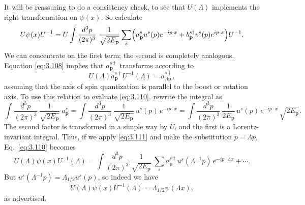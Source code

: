 It will be reassuring to do a consistency check, to see that $U(\Lambda)$
implements the right transformation on $\psi(x)$.  So calculate
\begin{equation}
  U\psi(x)U^{-1} = U \int \frac{d^3p}{(2\pi)^3}\ \frac{1}{\sqrt{2E_{\mathbf{p}}}}
    \sum_s \Bigl( a_{\mathbf{p}}^s u^s(p)e^{-ip\cdot x}
      + b_{\mathbf{p}}^{s\dagger} v^s(p)e^{ip\cdot x} \Bigr) U^{-1}.
  \label{eq:3.110}
\end{equation}
We can concentrate on the first term; the second is completely analogous.
Equation \eqref{eq:3.108} implies that $a_{\mathbf{p}}^{s\dagger}$ transforms
according to
\begin{equation}
  U(\Lambda)a_{\mathbf{p}}^{s\dagger}U^{-1}(\Lambda)
    = a_{\Lambda\mathbf{p}}^{s\dagger},
  \label{eq:3.111}
\end{equation}
assuming that the axis of spin quantization is parallel to the boost or
rotation axis.  To use this relation to evaluate \eqref{eq:3.110}, rewrite
the integral as
\begin{equation}
  \int \frac{d^3p}{(2\pi)^3}\ \frac{1}{\sqrt{2E_{\mathbf{p}}}}\ a_{\mathbf{p}}^s
    = \int \frac{d^3p}{(2\pi)^3}\ \frac{1}{\sqrt{2E_{\mathbf{p}}}}\,
      u^s(p)\, e^{-ip\cdot x}
    = \int \frac{d^3p}{(2\pi)^3}\ \frac{1}{2E_{\mathbf{p}}}\,
      u^s(p)\, e^{-ip\cdot x}\, \sqrt{2E_{\mathbf{p}}} .
\end{equation}
The second factor is transformed in a simple way by $U$, and the first is a
Lorentz-invariant integral.  Thus, if we apply \eqref{eq:3.111} and make the
substitution $p = \Lambda p$, Eq.~\eqref{eq:3.110} becomes
\begin{equation}
  U(\Lambda)\psi(x)U^{-1}(\Lambda) =
    \int \frac{d^3p}{(2\pi)^3}\ \frac{1}{\sqrt{2E_{\mathbf{p}}}}\,
    \sum_s a_{\mathbf{p}}^{s\dagger}
    u^s(\Lambda^{-1}p)\, e^{-ip\cdot \Lambda x} + \cdots .
\end{equation}
But $u^s(\Lambda^{-1}p) = \Lambda_{1/2}u^s(p)$, so indeed we have
\begin{equation}
  U(\Lambda)\psi(x)U^{-1}(\Lambda) = \Lambda_{1/2}\psi(\Lambda x),
  \label{eq:3.112}
\end{equation}
as advertised.


